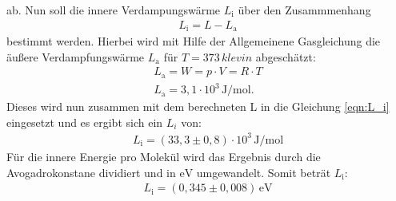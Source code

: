 ab.
Nun soll die innere Verdampungswärme $L_\mathrm{i}$
über den Zusammmenhang
\begin{align}
L_\mathrm{i}=L-L_\mathrm{a}\label{eqn:L_i}
\end{align}
bestimmt werden.
Hierbei wird mit Hilfe der Allgemeinene Gasgleichung
die äußere Verdampfungswärme $L_\mathrm{a}$
für $T = 373\,\si{klevin}$
abgeschätzt:
\begin{align*}
  L_\mathrm{a}=W=p\cdot V=R\cdot T\\
  L_\mathrm{a}=3,1\cdot10^3\,\si{\joule\per\mol}.
\end{align*}
Dieses wird nun zusammen mit dem berechneten L in die
Gleichung \eqref{eqn:L_i} eingesetzt und es ergibt sich ein
$L_i$ von:
\begin{align*}
L_\mathrm{i}=(33,3\pm0,8)\cdot10^3\,\si{\joule\per\mol}
\end{align*}
Für die innere Energie pro Molekül wird das Ergebnis
durch die Avogadrokonstane dividiert und
in $\si{\electronvolt}$ umgewandelt. Somit beträt $L_\mathrm{i}$:
\begin{align*}
L_\mathrm{i}=(0,345\pm0,008)\,\si{\electronvolt}
\end{align*}
\newpage
